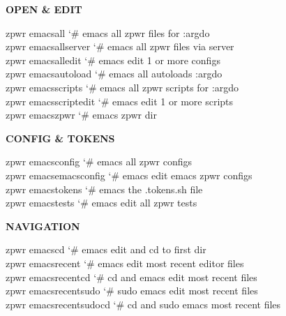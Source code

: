 \documentclass[11pt,a4paper,twoside]{book}
\begin{document}
\vspace{12pt}
{\bfseries\color{neonyellow} OPEN \& EDIT}\vspace{4pt}

\begin{codebox}
\color{neongreen}zpwr emacsall              {\char`\#} emacs all zpwr files for :argdo\\
\color{neongreen}zpwr emacsallserver        {\char`\#} emacs all zpwr files via server\\
\color{neongreen}zpwr emacsalledit          {\char`\#} emacs edit 1 or more configs\\
\color{neongreen}zpwr emacsautoload         {\char`\#} emacs all autoloads :argdo\\
\color{neongreen}zpwr emacsscripts          {\char`\#} emacs all zpwr scripts for :argdo\\
\color{neongreen}zpwr emacsscriptedit       {\char`\#} emacs edit 1 or more scripts\\
\color{neongreen}zpwr emacszpwr             {\char`\#} emacs zpwr dir\\
\end{codebox}


\vspace{12pt}
{\bfseries\color{neonyellow} CONFIG \& TOKENS}\vspace{4pt}

\begin{codebox}
\color{neongreen}zpwr emacsconfig           {\char`\#} emacs all zpwr configs\\
\color{neongreen}zpwr emacsemacsconfig      {\char`\#} emacs edit emacs zpwr configs\\
\color{neongreen}zpwr emacstokens           {\char`\#} emacs the .tokens.sh file\\
\color{neongreen}zpwr emacstests            {\char`\#} emacs edit all zpwr tests\\
\end{codebox}


\vspace{12pt}
{\bfseries\color{neonyellow} NAVIGATION}\vspace{4pt}

\begin{codebox}
\color{neongreen}zpwr emacscd               {\char`\#} emacs edit and cd to first dir\\
\color{neongreen}zpwr emacsrecent           {\char`\#} emacs edit most recent editor files\\
\color{neongreen}zpwr emacsrecentcd         {\char`\#} cd and emacs edit most recent files\\
\color{neongreen}zpwr emacsrecentsudo       {\char`\#} sudo emacs edit most recent files\\
\color{neongreen}zpwr emacsrecentsudocd     {\char`\#} cd and sudo emacs most recent files\\
\end{codebox}
\end{document}
